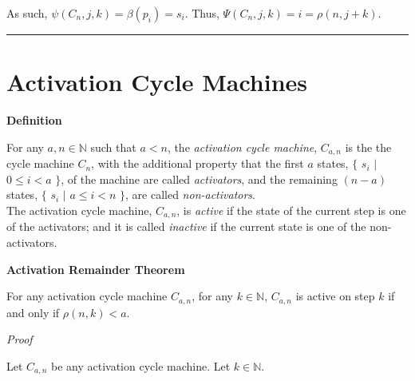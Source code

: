 \documentclass[a4paper,12pt]{article}
\begin{document}
\noindent As such, $\psi(C_n, j, k) = \beta(p_i) = s_i$. Thus, $\Psi(C_n, j, k) = i = \rho(n, j + k)$.
 
\begin{center}
\noindent\rule{8cm}{0.4pt}
\end{center}





\section{Activation Cycle Machines}
\label{section:activation_cycle_machines}
\hypertarget{section:activation_cycle_machines}{}




\label{definition:state_position_function}
\hypertarget{definition:state_position_function}{}
\begin{tcolorbox}
\textbf{Definition}

\noindent For any $a, n \in \mathbb{N}$ such that $a < n$, the \textit{activation cycle machine}, $C_{a, n}$ is the the cycle machine $C_n$, with the additional property that the first $a$ states, $\{$ $s_i$ $|$ $0 \leq i < a$ $\}$, of the machine are called \textit{activators}, and the remaining $(n - a)$ states, $\{$ $s_i$ $|$ $a \leq i < n$ $\}$, are called \textit{non-activators}.\\

\noindent The activation cycle machine, $C_{a, n}$, is \textit{active} if the state of the current step is one of the activators; and it is called \textit{inactive} if the current state is one of the non-activators.

\end{tcolorbox}








\label{theorem:activation_remainder_theorem}
\hypertarget{theorem:activation_remainder_theorem}{}
\begin{tcolorbox}
\textbf{Activation Remainder Theorem}

\noindent For any activation cycle machine $C_{a, n}$, for any $k \in \mathbb{N}$,  $C_{a, n}$ is active on step $k$ if and only if $\rho(n, k) < a$.

\end{tcolorbox}

\noindent
\textit{Proof}

\noindent Let $C_{a, n}$ be any activation cycle machine. Let $k \in \mathbb{N}$.\\
\end{document}
